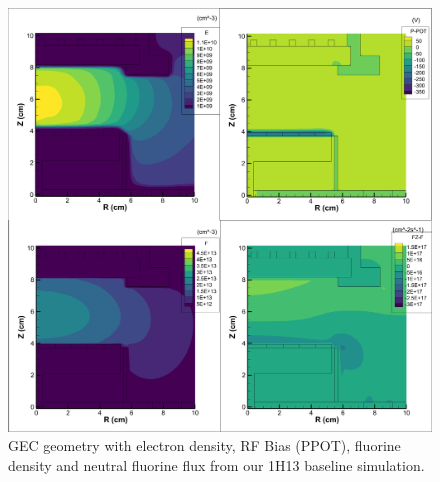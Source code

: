 \documentclass[12pt]{article}
\begin{document}
\begin{figure}[H]
    \centering
    \includegraphics[width=\linewidth]{Figures/4x4 Plasma.png}
    \caption{GEC geometry with electron density, RF Bias (PPOT), fluorine density and neutral fluorine flux from our 1H13 baseline simulation.}
    \label{fig:GEC_electron_density}
\end{figure}
\end{document}
